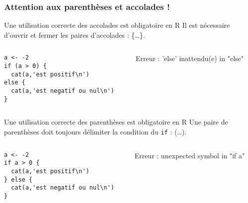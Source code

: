 \documentclass[10pt]{beamer}
\begin{document}
\begin{frame}[fragile]
  \frametitle{Attention aux parenthèses et accolades !}
  \begin{block}{Une utilisation correcte des accolades est obligatoire en R}
    Il est nécessaire d’ouvrir et fermer les paires d’accolades : \{\dots\}.
    \begin{columns}[c]
      \begin{column}{0.55\textwidth}
        \begin{lstlisting}[style=editor, escapechar=?]
a <- -2
if (a > 0) {
  cat(a,'est positif\n')
else { 
  cat(a,'est negatif ou nul\n')
}    
\end{lstlisting}
\end{column}
\begin{column}{0.45\textwidth}
\RUN
\alert{Erreur : 'else' inattendu(e) in "else"}
\end{column}
\end{columns} 
\end{block}

\begin{block}{Une utilisation correcte des parenthèses est obligatoire en R}
    Une paire de parenthèses doit toujours délimiter la condition du \texttt{if} : (\dots).
    \begin{columns}[c]
      \begin{column}{0.55\textwidth}
        \begin{lstlisting}[style=editor, escapechar=?]
a <- -2
if a > 0 {
  cat(a,'est positif\n')
} else { 
  cat(a,'est negatif ou nul\n')
}    
\end{lstlisting}
\end{column}
\begin{column}{0.45\textwidth}
\RUN
\alert{Erreur : unexpected symbol in "if a"}
\end{column}
\end{columns} 
\end{block}

\end{frame}

\end{document}
